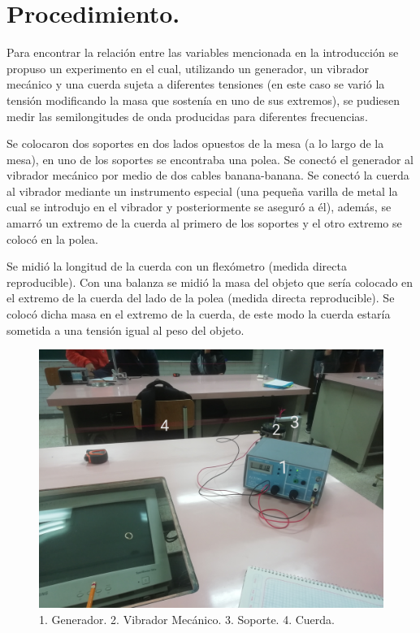 \documentclass[10pt,a4paper]{article}
\begin{document}
\section{Procedimiento.}

Para encontrar la relación entre las variables mencionada en la introducción se propuso un experimento en el cual, utilizando un generador, un vibrador mecánico y una cuerda sujeta a diferentes tensiones (en este caso se varió la tensión modificando la masa que sostenía en uno de sus extremos), se pudiesen medir las semilongitudes de onda producidas para diferentes frecuencias.

Se colocaron dos soportes en dos lados opuestos de la mesa (a lo largo de la mesa), en uno de los soportes se encontraba una polea. Se conectó el generador al vibrador mecánico por medio de dos cables banana-banana. Se conectó la cuerda al vibrador mediante un instrumento especial (una pequeña varilla de metal la cual se introdujo en el vibrador y posteriormente se aseguró a él), además, se amarró un extremo de la cuerda al primero de los soportes y el otro extremo se colocó en la polea. 

Se midió la longitud de la cuerda con un flexómetro (medida directa reproducible). Con una balanza se midió la masa del objeto que sería colocado en el extremo de la cuerda del lado de la polea (medida directa reproducible). Se colocó dicha masa en el extremo de la cuerda, de este modo la cuerda estaría sometida a una tensión igual al peso del objeto. 

\begin{figure}[H]
\includegraphics[scale=0.09]{IMG_20191121_190334.jpg}
\centering
\caption{1. Generador. 2. Vibrador Mecánico. 3. Soporte. 4. Cuerda. }
\end{figure}
\end{document}
